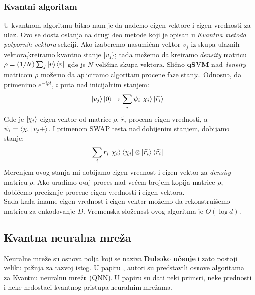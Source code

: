\documentclass[12pt, letterpaper, oneside]{article}
\begin{document}
\subsubsection{Kvantni algoritam}
U kvantnom algoritmu bitno nam je da nađemo eigen vektore i eigen vrednosti za ulaz. Ovo se dosta oslanja na drugi deo metode koji je opisan u \textit{Kvantna metoda potpornih vektora} sekciji.
Ako izaberemo nasumičan vektor $v_j$ iz skupa ulaznih vektora,kreiramo kvantno stanje $\Ket{v_j}$; tada možemo da kreiramo \textit{density} matricu $\rho = (1/N)\sum_j\Ket{v}\Bra{v}$ gde je $N$ veličina skupa vektora. \cite{Quantum_machine_learning}
Slično \textbf{qSVM} nad \textit{density} matricom $\rho$ možemo da apliciramo algoritam procene faze stanja. Odnosno, da primenimo $e^{-i \rho t}$, $t$ puta nad inicijalnim stanjem:
\[
    \Ket{v_j}\Ket{0} \to \sum_i \psi_i\Ket{\chi_i}\Ket{\widetilde{r_i}}
\] 
Gde je $\Ket{\chi_i}$ eigen vektor od matrice $\rho$, $\widetilde{r_i}$ procena eigen vrednosti, a $\psi_i = \Braket{\chi_i|v_j+}$.
I primenom SWAP testa nad dobijenim stanjem, dobijamo stanje:
\[
    \sum_i r_i \Ket{\chi_i}\Bra{\chi_i}\otimes \Ket{\widetilde{r_i}}\Bra{\widetilde{r_i}}
\]
Merenjem ovog stanja mi dobijamo eigen vrednost i eigen vektor za \textit{density} matricu $\rho$. Ako uradimo ovaj proces nad većem brojem kopija matrice $\rho$, dobićemo preciznije procene eigen vrednosti i eigen vektora. \\
Sada kada imamo eigen vrednost i eigen vektor možemo da rekonstruišemo matricu za enkodovanje $D$. Vremenska složenost ovog algoritma je $O(\log d)$. \cite{Lloyd_2014}

\subsection{Kvantna neuralna mreža}
Neuralne mreže su osnova polja koji se naziva \textbf{Duboko učenje} i zato postoji veliku pažnja za razvoj istog.
U papiru \cite{Classification_wit_QNN}, autori su predstavili osnove algoritama za Kvantnu neuralnu mrežu (QNN).
U papiru su dati neki primeri, neke prednosti i neke nedostaci kvantnog pristupa neuralnim mrežama.
\end{document}
